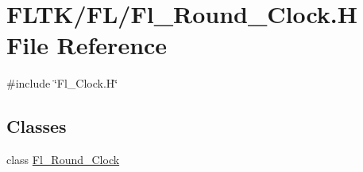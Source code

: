 \hypertarget{_fl___round___clock_8_h}{}\section{F\+L\+T\+K/\+F\+L/\+Fl\+\_\+\+Round\+\_\+\+Clock.H File Reference}
\label{_fl___round___clock_8_h}
{\ttfamily \#include \char`\"{}Fl\+\_\+\+Clock.\+H\char`\"{}}\newline
\subsection*{Classes}
\begin{DoxyCompactItemize}
\item 
class \hyperlink{class_fl___round___clock}{Fl\+\_\+\+Round\+\_\+\+Clock}
\end{DoxyCompactItemize}
